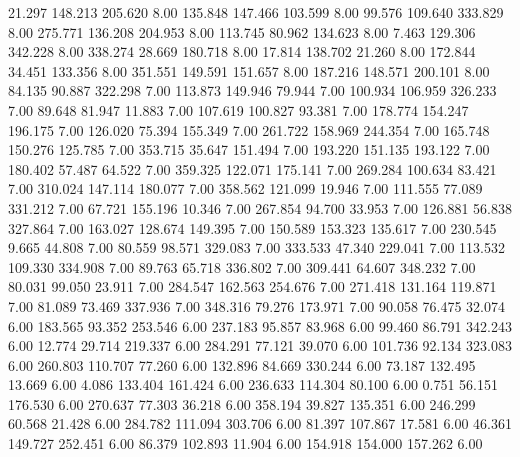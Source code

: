   21.297  148.213  205.620         8.00
 135.848  147.466  103.599         8.00
  99.576  109.640  333.829         8.00
 275.771  136.208  204.953         8.00
 113.745   80.962  134.623         8.00
   7.463  129.306  342.228         8.00
 338.274   28.669  180.718         8.00
  17.814  138.702   21.260         8.00
 172.844   34.451  133.356         8.00
 351.551  149.591  151.657         8.00
 187.216  148.571  200.101         8.00
  84.135   90.887  322.298         7.00
 113.873  149.946   79.944         7.00
 100.934  106.959  326.233         7.00
  89.648   81.947   11.883         7.00
 107.619  100.827   93.381         7.00
 178.774  154.247  196.175         7.00
 126.020   75.394  155.349         7.00
 261.722  158.969  244.354         7.00
 165.748  150.276  125.785         7.00
 353.715   35.647  151.494         7.00
 193.220  151.135  193.122         7.00
 180.402   57.487   64.522         7.00
 359.325  122.071  175.141         7.00
 269.284  100.634   83.421         7.00
 310.024  147.114  180.077         7.00
 358.562  121.099   19.946         7.00
 111.555   77.089  331.212         7.00
  67.721  155.196   10.346         7.00
 267.854   94.700   33.953         7.00
 126.881   56.838  327.864         7.00
 163.027  128.674  149.395         7.00
 150.589  153.323  135.617         7.00
 230.545    9.665   44.808         7.00
  80.559   98.571  329.083         7.00
 333.533   47.340  229.041         7.00
 113.532  109.330  334.908         7.00
  89.763   65.718  336.802         7.00
 309.441   64.607  348.232         7.00
  80.031   99.050   23.911         7.00
 284.547  162.563  254.676         7.00
 271.418  131.164  119.871         7.00
  81.089   73.469  337.936         7.00
 348.316   79.276  173.971         7.00
  90.058   76.475   32.074         6.00
 183.565   93.352  253.546         6.00
 237.183   95.857   83.968         6.00
  99.460   86.791  342.243         6.00
  12.774   29.714  219.337         6.00
 284.291   77.121   39.070         6.00
 101.736   92.134  323.083         6.00
 260.803  110.707   77.260         6.00
 132.896   84.669  330.244         6.00
  73.187  132.495   13.669         6.00
   4.086  133.404  161.424         6.00
 236.633  114.304   80.100         6.00
   0.751   56.151  176.530         6.00
 270.637   77.303   36.218         6.00
 358.194   39.827  135.351         6.00
 246.299   60.568   21.428         6.00
 284.782  111.094  303.706         6.00
  81.397  107.867   17.581         6.00
  46.361  149.727  252.451         6.00
  86.379  102.893   11.904         6.00
 154.918  154.000  157.262         6.00
